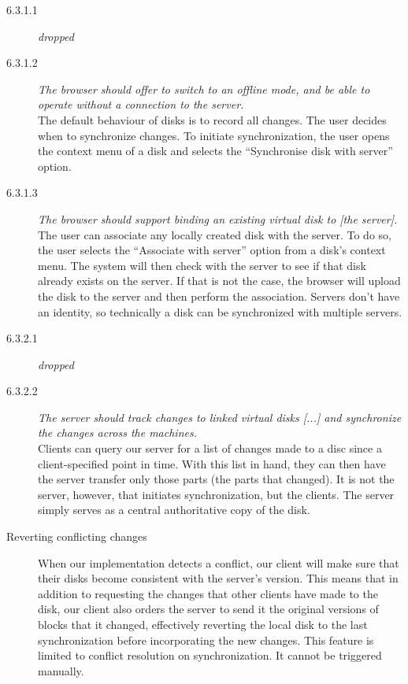 \documentclass[a4paper,12pt]{article}
\begin{document}
\begin{description}
\item[6.3.1.1] \emph{dropped}
\item[6.3.1.2] \emph{The browser should offer to switch to an offline mode, and be able to operate without a connection to the server.} \\
The default behaviour of disks is to record all changes. 
The user decides when to synchronize changes.
To initiate synchronization, the user opens the context menu of a disk and selects the ``Synchronise disk with server'' option.
\item[6.3.1.3] \emph{The browser should support binding an existing virtual disk to [the server].} \\
The user can associate any locally created disk with the server.
To do so, the user selects the ``Associate with server'' option from a disk's context menu.
The system will then check with the server to see if that disk already exists on the server. 
If that is not the case, the browser will upload the disk to the server and then perform the association.
Servers don't have an identity, so technically a disk can be synchronized with multiple servers.

\item[6.3.2.1] \emph{dropped}
\item[6.3.2.2] \emph{The server should track changes to linked virtual disks [...] and synchronize the changes across the machines.}\\
Clients can query our server for a list of changes made to a disc since a client-specified point in time.
With this list in hand, they can then have the server transfer only those parts (the parts that changed).
It is not the server, however, that initiates synchronization, but the clients.
The server simply serves as a central authoritative copy of the disk.

\item[Reverting conflicting changes] 
When our implementation detects a conflict, our client will make sure that their disks become consistent with the server's version.
This means that in addition to requesting the changes that other clients have made to the disk, our client also orders the server to send it the original versions of blocks that it changed, effectively reverting the local disk to the last synchronization before incorporating the new changes.
This feature is limited to conflict resolution on synchronization. It cannot be triggered manually.

\end{description}
\end{document}
